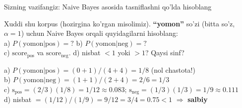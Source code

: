 \documentclass[aspectratio=169,11pt]{beamer}
\begin{document}
\begin{frame}{Sizning vazifangiz: Naive Bayes asosida tasniflashni qo'lda hisoblang}
  \begin{tcolorbox}[warnbox,title=Vazifa (4 daqiqa)]
    \small
    Xuddi shu korpus (hozirgina ko'rgan misolimiz). 
    \textbf{``yomon''} so'zi (bitta so'z, $\alpha{=}1$) uchun Naive Bayes orqali quyidagilarni hisoblang:\\[4pt]
    a)\; $P(\text{yomon}|\text{pos}) = ?$\qquad
    b)\; $P(\text{yomon}|\text{neg}) = ?$\\[4pt]
    c)\; $\text{score}_\text{pos}$ va $\text{score}_\text{neg}$.\quad
    d)\; nisbat $<1$ yoki $>1$?\; Qaysi sinf?
  \end{tcolorbox}
  \pause
  \begin{tcolorbox}[okbox,title=Javob]
    \small
    a)\; $P(\text{yomon}|\text{pos})=(0{+}1)/(4{+}4)=1/8$
         \;\textcolor{halfgray}{\footnotesize (nol chastota!)}\\[4pt]
    b)\; $P(\text{yomon}|\text{neg})=(1{+}1)/(2{+}4)=2/6=1/3$\\[4pt]
    c)\; $\text{s}_\text{pos}=(2/3)(1/8)=1/12\approx 0.083$;\;
         $\text{s}_\text{neg}=(1/3)(1/3)=1/9\approx 0.111$\\[4pt]
    d)\; nisbat $=(1/12)/(1/9)=9/12=3/4=0.75<1$
         $\Rightarrow$ \textcolor{deepred}{\textbf{salbiy}} \checkmark
  \end{tcolorbox}
\end{frame}
\end{document}
